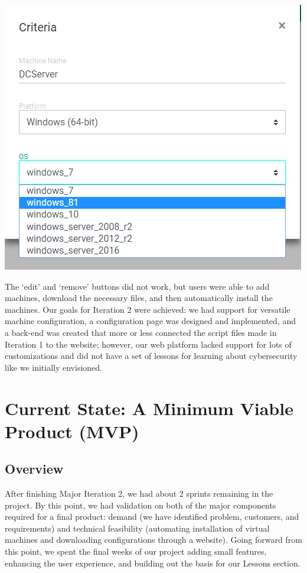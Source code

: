 \documentclass[openright]{report}
\begin{document}
\begin{center}
    \includegraphics[scale=0.64]{images/modal.png}
    \label{modal}
\end{center}

\par The `edit' and `remove' buttons did not work, but users were able to add machines, download the necessary files, and then automatically install the machines. Our goals for Iteration 2 were achieved: we had support for versatile machine configuration, a configuration page was designed and implemented, and a back-end was created that more or less connected the script files made in Iteration 1 to the website; however, our web platform lacked support for lots of customizations and did not have a set of lessons for learning about cybersecurity like we initially envisioned.

\chapter{Current State: A Minimum Viable Product (MVP)}

\section{Overview}
After finishing Major Iteration 2, we had about 2 sprints remaining in the project. By this point, we had validation on both of the major components required for a final product: demand (we have identified problem, customers, and requirements) and technical feasibility (automating installation of virtual machines and  downloading configurations through a website). Going forward from this point, we spent the final weeks of our project adding small features, enhancing the user experience, and building out the basis for our Lessons section.
\end{document}
